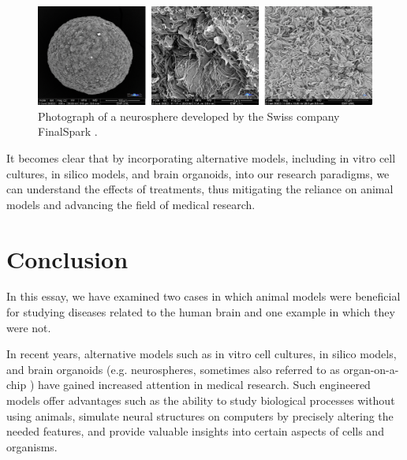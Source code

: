 \documentclass[10pt]{article}
\begin{document}
\begin{sloppypar}
  \vspace{10pt} %
  \begin{figure}[ht]
    \centering
    \includegraphics[width=\textwidth]{figures/neurosphere.png}
    \caption[Photographs of a neurosphere developed by the Swiss company FinalSpark]{Photograph of a neurosphere developed by the Swiss company FinalSpark \citep{finalspark_artificial_2022}.}
    \label{fig:neurospheres}
  \end{figure}

  It becomes clear that by incorporating alternative models, including in vitro cell cultures, in silico models, and brain organoids, into our research paradigms, we can understand the effects of treatments, thus mitigating the reliance on animal models and advancing the field of medical research.

  \section{Conclusion}
  \label{sec:conclusion}

  In this essay, we have examined two cases in which animal models were beneficial for studying diseases related to the human brain and one example in which they were not.

  In recent years, alternative models such as in vitro cell cultures, in silico models, and brain organoids (e.g. neurospheres, sometimes also referred to as organ-on-a-chip \citep{huh_reconstituting_2010}) have gained increased attention in medical research. Such engineered models offer advantages such as the ability to study biological processes without using animals, simulate neural structures on computers by precisely altering the needed features, and provide valuable insights into certain aspects of cells and organisms.


\end{sloppypar}
\end{document}
